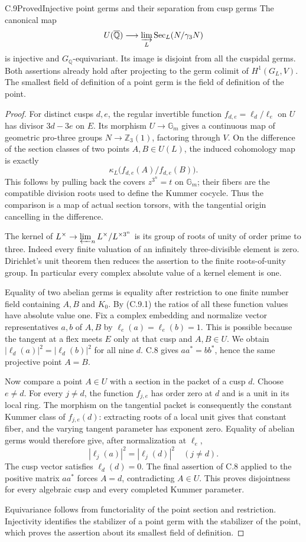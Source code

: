 \begin{statement}{C.9}{Proved}{Injective point germs and their separation from cusp germs}
The canonical map
\[
 U(\overline{\mathbb Q})\longrightarrow
 \varinjlim_L\operatorname{Sec}_L(N/\gamma_3N)
\]
is injective and $G_{\mathbb Q}$-equivariant. Its image is
disjoint from all the cuspidal germs. Both assertions already
hold after projecting to the germ colimit of $H^1(G_L,V)$.
The smallest field of definition of a point germ is the field
of definition of the point.
\end{statement}
\begin{proof}
For distinct cusps $d,e$, the regular invertible function
$f_{d,e}=\ell_d/\ell_e$ on $U$ has divisor $3d-3e$ on $E$.
Its morphism $U\to\mathbb G_m$ gives a continuous map of
geometric pro-three groups $N\to\mathbb Z_3(1)$, factoring
through $V$. On the difference of the section classes of two
points $A,B\in U(L)$, the induced cohomology map is exactly
\[
 \kappa_L\bigl(f_{d,e}(A)/f_{d,e}(B)\bigr).
 \tag{C.9.1}
\]
This follows by pulling back the covers $z^{3^n}=t$ on
$\mathbb G_m$; their fibers are the compatible division roots
used to define the Kummer cocycle. Thus the comparison is a
map of actual section torsors, with the tangential origin
cancelling in the difference.

The kernel of $L^\times\to\varprojlim_n L^\times/L^{\times3^n}$
is its group of roots of unity of order prime to three.
Indeed every finite valuation of an infinitely three-divisible
element is zero. Dirichlet's unit theorem then reduces the
assertion to the finite roots-of-unity group. In particular
every complex absolute value of a kernel element is one.

Equality of two abelian germs is equality after restriction to
one finite number field containing $A,B$ and $K_0$. By (C.9.1)
the ratios of all these function values have absolute value one.
Fix a complex embedding and normalize vector representatives
$a,b$ of $A,B$ by $\ell_e(a)=\ell_e(b)=1$.
This is possible because the tangent at a flex meets $E$ only
at that cusp and $A,B\in U$. We obtain
$|\ell_d(a)|^2=|\ell_d(b)|^2$ for all nine $d$.
C.8 gives $aa^*=bb^*$, hence the same projective point $A=B$.

Now compare a point $A\in U$ with a section in the packet of
a cusp $d$. Choose $e\ne d$. For every $j\ne d$, the function
$f_{j,e}$ has order zero at $d$ and is a unit in its local ring.
The morphism on the tangential packet is consequently the
constant Kummer class of $f_{j,e}(d)$: extracting roots of a
local unit gives that constant fiber, and the varying tangent
parameter has exponent zero. Equality of abelian germs would
therefore give, after normalization at $\ell_e$,
\[
 |\ell_j(a)|^2=|\ell_j(d)|^2\quad(j\ne d).
\]
The cusp vector satisfies $\ell_d(d)=0$. The final assertion
of C.8 applied to the positive matrix $aa^*$ forces $A=d$,
contradicting $A\in U$. This proves disjointness for every
algebraic cusp and every completed Kummer parameter.

Equivariance follows from functoriality of the point section
and restriction. Injectivity identifies the stabilizer of a
point germ with the stabilizer of the point, which proves the
assertion about its smallest field of definition.
\end{proof}
